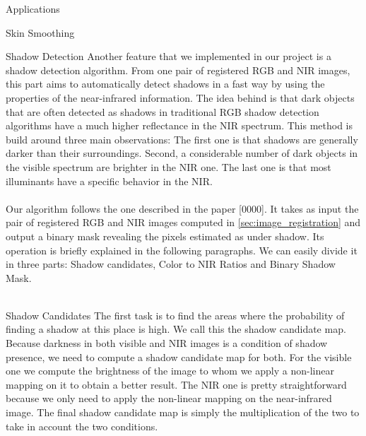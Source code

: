 \documentclass[10pt]{article}
\begin{document}
\begin{section}{Applications}

    \begin{subsection}{Skin Smoothing}
        \label{sec:skin_smoothing}
    \end{subsection}


        \begin{subsection}{Shadow Detection}
            \label{sec:shadow_detection}
            Another feature that we implemented in our project is a shadow detection algorithm. From one pair of registered RGB and NIR images, this part aims to automatically detect shadows in a fast way by using the properties of the near-infrared information. The idea behind is that dark objects that are often detected as shadows in traditional RGB shadow detection algorithms have a much higher reflectance in the NIR spectrum. This method is build around three main observations: The first one is that shadows are generally darker than their surroundings. Second, a considerable number of dark objects in the visible spectrum are brighter in the NIR one. The last one is that most illuminants have a specific behavior in the NIR.
            \\ \\
            Our algorithm follows the one described in the paper [0000]. It takes as input the pair of registered RGB and NIR images computed in \ref{sec:image_registration} and output a binary mask revealing the pixels estimated as under shadow. Its operation is briefly explained in the following paragraphs. We can easily divide it in three parts: Shadow candidates, Color to NIR Ratios and Binary Shadow Mask.
            \\ \\


            \begin{subsubsection}{Shadow Candidates}
                \label{sec:shadow_candidates}
                The first task is to find the areas where the probability of finding a shadow at this place is high. We call this the shadow candidate map. Because darkness in both visible and NIR images is a condition of shadow presence, we need to compute a shadow candidate map for both. For the visible one we compute the brightness of the image to whom we apply a non-linear mapping on it to obtain a better result. The NIR one is pretty straightforward because we only need to apply the non-linear mapping on the near-infrared image. The final shadow candidate map is simply the multiplication of the two to take in account the two conditions.
            \end{subsubsection}


\end{subsection}
\end{section}
\end{document}

